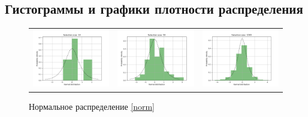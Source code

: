 \documentclass[a4paper]{article}
\begin{document}
\subsection{Гистограммы и графики плотности распределения}
	\begin{figure}[H]
		\centering
		\begin{tabular}{ccc}
			\includegraphics[width=55mm, height =0.25\textheight]{normal_10.png}
			&
			\includegraphics[width=55mm, height =0.25\textheight]{normal_50.png}
			&
			\includegraphics[width=55mm, height =0.25\textheight]{normal_1000.png}
		\end{tabular}
		\caption{Нормальное распределение \eqref{norm}} 
		\label{fig:normal}
	\end{figure}
\end{document}
